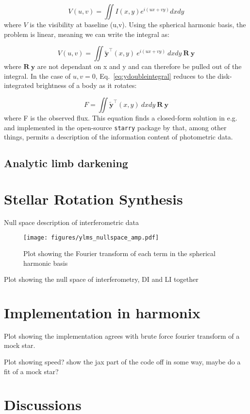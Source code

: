 \documentclass[modern]{aastex631}
\begin{document}
\begin{equation}
V(u,v) = \iint I(x,y) e^{i(ux + vy)} dxdy
\end{equation}
where $V$ is the visibility at baseline (u,v). Using the spherical harmonic basis, the problem is linear, meaning we can write the integral as:

\begin{equation} \label{eq:ydoubleintegral}
   V(u,v) = \iint \mathbf{\tilde{y}}^\top(x,y) \ e^{i(ux + vy)} \ dxdy \ \mathbf{R} \ \mathbf{y}
\end{equation} 
where $\mathbf{R} \ \mathbf{y}$ are not dependant on x and y and can therefore be pulled out of the integral. In the case of $u, v = 0$, Eq.~\ref{eq:ydoubleintegral} reduces to the disk-integrated brightness of a body as it rotates:

\begin{equation} \label{eq:ydoubleintegral}
   F = \iint \mathbf{\tilde{y}}^\top(x,y) \ dxdy \ \mathbf{R} \ \mathbf{y}
\end{equation}
where F is the observed flux. This equation finds a closed-form solution in e.g. \citep{cowan2013} and implemented in the open-source \texttt{starry} package by \citep{starry2019} that, among other things, permits a description of the information content of photometric data.

\subsection{Analytic limb darkening}

\section{Stellar Rotation Synthesis}
\label{sec:rotsynthesis}
Null space description of interferometric data

\begin{figure}[ht!]
    \begin{centering}
        \texttt{[image: figures/ylms\_nullspace\_amp.pdf]}
        \caption{
            Plot showing the Fourier transform of each term in the spherical harmonic basis
        }
        \label{fig:pyramid}
    \end{centering}
\end{figure}

Plot showing the null space of interferometry, DI and LI together
\section{Implementation in harmonix}
\label{sec:harmonix}
Plot showing the implementation agrees with brute force fourier transform of a mock star. 

Plot showing speed? show the jax part of the code off in some way, maybe do a fit of a mock star?
\section{Discussions}
\label{sec:discussions}


\end{document}
